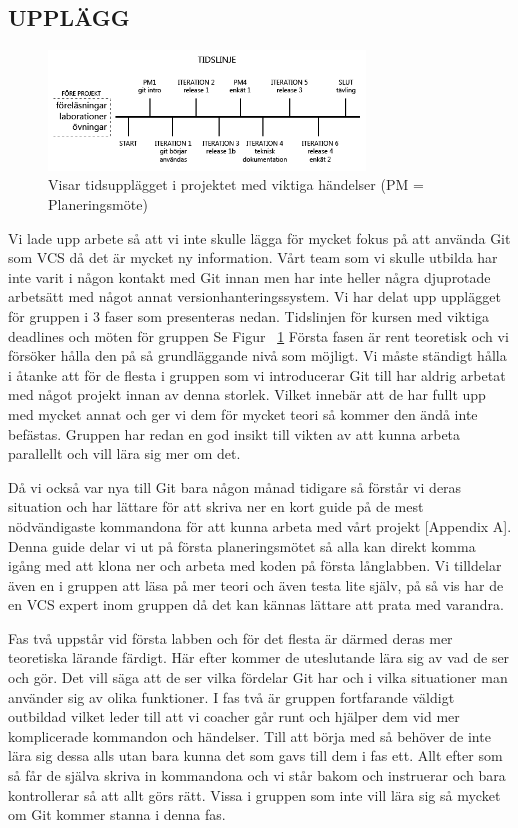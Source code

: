 \subsection{UPPLÄGG}
\label{Upplagg}

\begin{figure}[htb!]\centering\includegraphics[width=0.75\textwidth]{Tidslinje.png}\caption{Visar tidsupplägget i projektet med viktiga händelser (PM = Planeringsmöte)}\label{fig:Timeline}\end{figure}

Vi lade upp arbete så att vi inte skulle lägga för mycket fokus på att använda Git som VCS då det är mycket ny information. Vårt team som vi skulle utbilda har inte varit i någon kontakt med Git innan men har inte heller några djuprotade arbetsätt med något annat versionhanteringssystem. Vi har delat upp upplägget för gruppen i 3 faser som presenteras nedan. Tidslinjen för kursen med viktiga deadlines och möten för gruppen Se Figur~ \ref{fig:Timeline} Första fasen är rent teoretisk och vi försöker hålla den på så grundläggande nivå som möjligt. Vi måste ständigt hålla i åtanke att för de flesta i gruppen som vi introducerar Git till har aldrig arbetat med något projekt innan av denna storlek. Vilket innebär att de har fullt upp med mycket annat och ger vi dem för mycket teori så kommer den ändå inte befästas. Gruppen har redan en god insikt till vikten av att kunna arbeta parallellt och vill lära sig mer om det. 

Då vi också var nya till Git bara någon månad tidigare så förstår vi deras situation och har lättare för att skriva ner en kort guide på de mest nödvändigaste kommandona för att kunna arbeta med vårt projekt [Appendix A]. Denna guide delar vi ut på första planeringsmötet så alla kan direkt komma igång med att klona ner och arbeta med koden på första långlabben. Vi tilldelar även en i gruppen att läsa på mer teori och även testa lite själv, på så vis har de en VCS expert inom gruppen då det kan kännas lättare att prata med varandra.
 
Fas två uppstår vid första labben och för det flesta är därmed deras mer teoretiska lärande färdigt. Här efter kommer de uteslutande lära sig av vad de ser och gör. Det vill säga att de ser vilka fördelar Git har och i vilka situationer man använder sig av olika funktioner. I fas två är gruppen fortfarande väldigt outbildad vilket leder till att vi coacher går runt och hjälper dem vid mer komplicerade kommandon och händelser. Till att börja med så behöver de inte lära sig dessa alls utan bara kunna det som gavs till dem i fas ett. Allt efter som så får de själva skriva in kommandona och vi står bakom och instruerar och bara kontrollerar så att allt görs rätt. Vissa i gruppen som inte vill lära sig så mycket om Git kommer stanna i denna fas.

